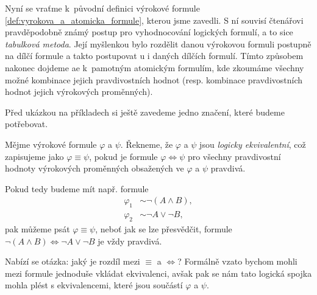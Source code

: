 Nyní se vraťme k~původní definici výrokové formule \ref{def:vyrokova_a_atomicka_formule}, kterou jsme zavedli. S ní souvisí čtenářovi pravděpodobně známý postup pro vyhodnocování logických formulí, a to sice \emph{tabulková metoda}. Její myšlenkou bylo rozdělit danou výrokovou formuli postupně na dílčí formule a takto postupovat u i daných dílčích formulí. Tímto způsobem nakonec dojdeme ae k~pamotným atomickým formulím, kde zkoumáme všechny možné kombinace jejich pravdivostních hodnot (resp. kombinace pravdivostních hodnot jejich výrokových proměnných).\par

Před ukázkou na příkladech si ještě zavedeme jedno značení, které budeme potřebovat.
\begin{definition}
    Mějme výrokové formule $\varphi$ a $\psi$. Řekneme, že $\varphi$ a $\psi$ jsou \emph{logicky ekvivalentní}, což zapisujeme jako $\varphi\equiv\psi$, pokud je formule $\varphi \iff \psi$ pro všechny pravdivostní hodnoty výrokových proměnných obsažených ve $\varphi$ a $\psi$ pravdivá.
\end{definition}

Pokud tedy budeme mít např. formule
\begin{align*}
    \varphi_1 &\sim \neg (A \land B),\\
    \varphi_2 &\sim \neg A \lor \neg B,
\end{align*}
pak můžeme psát $\varphi\equiv\psi$, neboť jak se lze přesvědčit, formule $\neg (A \land B) \iff \neg A \lor \neg B$ je vždy pravdivá.\par
Nabízí se otázka: jaký je rozdíl mezi $\equiv$ a $\iff$? Formálně vzato bychom mohli mezi formule jednoduše vkládat ekvivalenci, avšak pak se nám tato logická spojka mohla plést s ekvivalencemi, které jsou součástí $\varphi$ a $\psi$.

